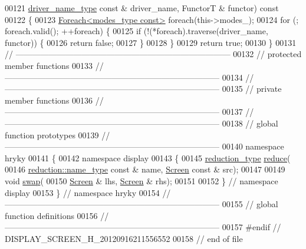 \begin{DoxyCode}
00121     \hyperlink{classhryky_1_1_string}{driver_name_type} \textcolor{keyword}{const} & driver\_name, FunctorT & functor)\textcolor{keyword}{ const}
00122 \textcolor{keyword}{}\{
00123     \hyperlink{classhryky_1_1_foreach}{Foreach<modes_type const>} \textcolor{keywordflow}{foreach}(this->modes\_);
00124     \textcolor{keywordflow}{for} (; \textcolor{keywordflow}{foreach}.valid(); ++\textcolor{keywordflow}{foreach}) \{
00125         \textcolor{keywordflow}{if} (!(*foreach).traverse(driver\_name, functor)) \{
00126             \textcolor{keywordflow}{return} \textcolor{keyword}{false};
00127         \}
00128     \}
00129     \textcolor{keywordflow}{return} \textcolor{keyword}{true};
00130 \}
00131 \textcolor{comment}{//
      ------------------------------------------------------------------------------}
00132 \textcolor{comment}{// protected member functions}
00133 \textcolor{comment}{//
      ------------------------------------------------------------------------------}
00134 \textcolor{comment}{//
      ------------------------------------------------------------------------------}
00135 \textcolor{comment}{// private member functions}
00136 \textcolor{comment}{//
      ------------------------------------------------------------------------------}
00137 \textcolor{comment}{//
      ------------------------------------------------------------------------------}
00138 \textcolor{comment}{// global function prototypes}
00139 \textcolor{comment}{//
      ------------------------------------------------------------------------------}
00140 \textcolor{keyword}{namespace }hryky
00141 \{
00142 \textcolor{keyword}{namespace }display
00143 \{
00145     \hyperlink{classhryky_1_1_intrusive_ptr}{reduction_type} \hyperlink{namespacehryky_1_1display_a705ac3a5de0998e1e0d3fa595044ec55}{reduce}(
00146         \hyperlink{classhryky_1_1reduction_1_1_string}{reduction::name_type} \textcolor{keyword}{const} & name, \hyperlink{classhryky_1_1display_1_1_screen}{Screen} \textcolor{keyword}{const} & src);
00147 
00149     \textcolor{keywordtype}{void} \hyperlink{namespacehryky_1_1display_ad28f0d5e406742090973e6c81321a00f}{swap}(
00150         \hyperlink{classhryky_1_1display_1_1_screen}{Screen} & lhs, \hyperlink{classhryky_1_1display_1_1_screen}{Screen} & rhs);
00151 
00152 \} \textcolor{comment}{// namespace display}
00153 \} \textcolor{comment}{// namespace hryky}
00154 \textcolor{comment}{//
      ------------------------------------------------------------------------------}
00155 \textcolor{comment}{// global function definitions}
00156 \textcolor{comment}{//
      ------------------------------------------------------------------------------}
00157 \textcolor{preprocessor}{#endif // DISPLAY\_SCREEN\_H\_20120916211556552}
00158 \textcolor{preprocessor}{}\textcolor{comment}{// end of file}
\end{DoxyCode}
